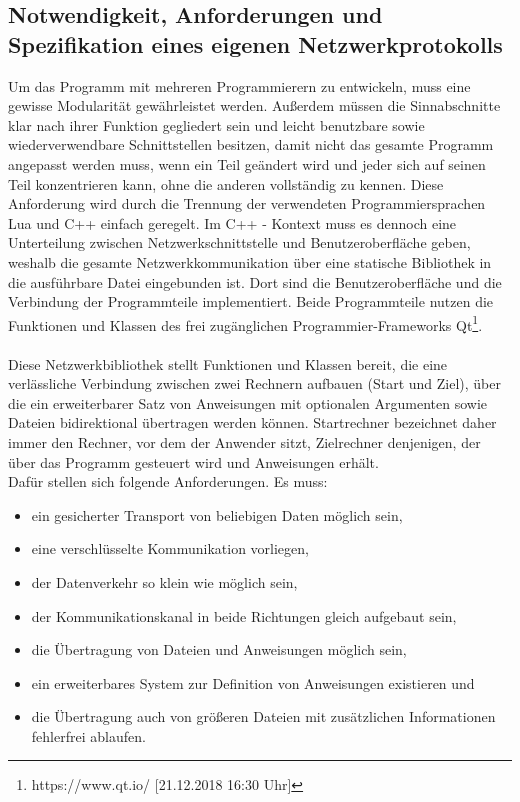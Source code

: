 \subsection{Notwendigkeit, Anforderungen und Spezifikation eines eigenen Netzwerkprotokolls}
Um das Programm mit mehreren Programmierern zu entwickeln, muss eine gewisse Modularität gewährleistet werden. Außerdem müssen die Sinnabschnitte klar nach ihrer Funktion gegliedert sein und leicht benutzbare sowie wiederverwendbare Schnittstellen besitzen, damit nicht das gesamte Programm angepasst werden muss, wenn ein Teil geändert wird und jeder sich auf seinen Teil konzentrieren kann, ohne die anderen vollständig zu kennen.
Diese Anforderung wird durch die Trennung der verwendeten Programmiersprachen Lua und C++ einfach geregelt. Im C++ - Kontext muss es dennoch eine Unterteilung zwischen Netzwerkschnittstelle und Benutzeroberfläche geben, weshalb die gesamte Netzwerkkommunikation über eine statische Bibliothek in die ausführbare Datei eingebunden ist. 
Dort sind die Benutzeroberfläche und die Verbindung der Programmteile implementiert. 
Beide Programmteile nutzen die Funktionen und Klassen des frei zugänglichen Programmier-Frameworks Qt\footnote{https://www.qt.io/ [21.12.2018 16:30 Uhr]}.\\\\
Diese Netzwerkbibliothek stellt Funktionen und Klassen bereit, die eine verlässliche Verbindung zwischen zwei Rechnern aufbauen (Start und Ziel), über die ein erweiterbarer Satz von Anweisungen mit optionalen Argumenten sowie Dateien bidirektional übertragen werden können.
Startrechner bezeichnet daher immer den Rechner, vor dem der Anwender sitzt, Zielrechner denjenigen, der über das Programm gesteuert wird und Anweisungen erhält.\\
Dafür stellen sich folgende Anforderungen. Es muss:\\

\begin{itemize}
\item ein gesicherter Transport von beliebigen Daten möglich sein,
\item eine verschlüsselte Kommunikation vorliegen,
\item der Datenverkehr so klein wie möglich sein,
\item der Kommunikationskanal in beide Richtungen gleich aufgebaut sein,
\item die Übertragung von Dateien und Anweisungen möglich sein,
\item ein erweiterbares System zur Definition von Anweisungen existieren und
\item die Übertragung auch von größeren Dateien mit zusätzlichen Informationen fehlerfrei ablaufen.
\end{itemize}

